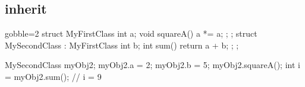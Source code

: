 \subsection{inherit}

\begin{frame}[fragile]
  \begin{multicols}{2}
    \begin{cppcode*}{gobble=2}
      struct MyFirstClass {
        int a;
        void squareA() { a *= a; };
      };
      struct MySecondClass :
        MyFirstClass {
        int b;
        int sum() { return a + b; };
      };

      MySecondClass myObj2;
      myObj2.a = 2;
      myObj2.b = 5;
      myObj2.squareA();
      int i = myObj2.sum(); // i = 9
    \end{cppcode*}
    \columnbreak
    \center
    \null \vfill
    \vfill \null
  \end{multicols}
\end{frame}

